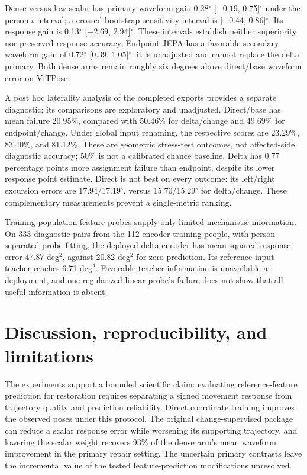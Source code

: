 \documentclass{article}
\newcommand{\degunit}{^{\circ}}
\begin{document}
Dense versus low scalar has primary waveform gain 0.28$\degunit$ [${-0.19}$, 0.75]$\degunit$ under the person-$t$ interval; a crossed-bootstrap sensitivity interval is [${-0.44}$, 0.86]$\degunit$. Its response gain is 0.13$\degunit$ [${-2.69}$, 2.94]$\degunit$. These intervals establish neither superiority nor preserved response accuracy. Endpoint JEPA has a favorable secondary waveform gain of 0.72$\degunit$ [0.39, 1.05]$\degunit$; it is unadjusted and cannot replace the delta primary. Both dense arms remain roughly six degrees above direct/base waveform error on ViTPose.

A post hoc laterality analysis of the completed exports provides a separate diagnostic; its comparisons are exploratory and unadjusted. Direct/base has mean failure 20.95\%, compared with 50.46\% for delta/change and 49.69\% for endpoint/change. Under global input renaming, the respective scores are 23.29\%, 83.40\%, and 81.12\%. These are geometric stress-test outcomes, not affected-side diagnostic accuracy; 50\% is not a calibrated chance baseline. Delta has 0.77 percentage points more assignment failure than endpoint, despite its lower response point estimate. Direct is not best on every outcome: its left/right excursion errors are 17.94/17.19$\degunit$, versus 15.70/15.29$\degunit$ for delta/change. These complementary measurements prevent a single-metric ranking.

Training-population feature probes supply only limited mechanistic information. On 333 diagnostic pairs from the 112 encoder-training people, with person-separated probe fitting, the deployed delta encoder has mean squared response error 47.87 deg$^2$, against 20.82 deg$^2$ for zero prediction. Its reference-input teacher reaches 6.71 deg$^2$. Favorable teacher information is unavailable at deployment, and one regularized linear probe's failure does not show that all useful information is absent.

\clearpage
\section{Discussion, reproducibility, and limitations}
The experiments support a bounded scientific claim: evaluating reference-feature prediction for restoration requires separating a signed movement response from trajectory quality and prediction reliability. Direct coordinate training improves the observed poses under this protocol. The original change-supervised package can reduce a scalar response error while worsening its supporting trajectory, and lowering the scalar weight recovers 93\% of the dense arm's mean waveform improvement in the primary repair setting. The uncertain primary contrasts leave the incremental value of the tested feature-prediction modifications unresolved.
\end{document}
